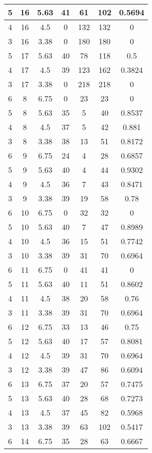\documentclass[letterpaper, 12pt]{article}
\begin{document}
\begin{longtable}{|c|c|c|c|c|c|c|}
\hline
5 & 16 & 5.63 & 41 & 61 & 102 & 0.5694 \\
\hline
4 & 16 & 4.5 & 0 & 132 & 132 & 0 \\
\hline
3 & 16 & 3.38 & 0 & 180 & 180 & 0 \\
\hline
5 & 17 & 5.63 & 40 & 78 & 118 & 0.5 \\
\hline
4 & 17 & 4.5 & 39 & 123 & 162 & 0.3824 \\
\hline
3 & 17 & 3.38 & 0 & 218 & 218 & 0 \\
\hline
6 & 8 & 6.75 & 0 & 23 & 23 & 0 \\
\hline
5 & 8 & 5.63 & 35 & 5 & 40 & 0.8537 \\
\hline
4 & 8 & 4.5 & 37 & 5 & 42 & 0.881 \\
\hline
3 & 8 & 3.38 & 38 & 13 & 51 & 0.8172 \\
\hline
6 & 9 & 6.75 & 24 & 4 & 28 & 0.6857 \\
\hline
5 & 9 & 5.63 & 40 & 4 & 44 & 0.9302 \\
\hline
4 & 9 & 4.5 & 36 & 7 & 43 & 0.8471 \\
\hline
3 & 9 & 3.38 & 39 & 19 & 58 & 0.78 \\
\hline
6 & 10 & 6.75 & 0 & 32 & 32 & 0 \\
\hline
5 & 10 & 5.63 & 40 & 7 & 47 & 0.8989 \\
\hline
4 & 10 & 4.5 & 36 & 15 & 51 & 0.7742 \\
\hline
3 & 10 & 3.38 & 39 & 31 & 70 & 0.6964 \\
\hline
6 & 11 & 6.75 & 0 & 41 & 41 & 0 \\
\hline
5 & 11 & 5.63 & 40 & 11 & 51 & 0.8602 \\
\hline
4 & 11 & 4.5 & 38 & 20 & 58 & 0.76 \\
\hline
3 & 11 & 3.38 & 39 & 31 & 70 & 0.6964 \\
\hline
6 & 12 & 6.75 & 33 & 13 & 46 & 0.75 \\
\hline
5 & 12 & 5.63 & 40 & 17 & 57 & 0.8081 \\
\hline
4 & 12 & 4.5 & 39 & 31 & 70 & 0.6964 \\
\hline
3 & 12 & 3.38 & 39 & 47 & 86 & 0.6094 \\
\hline
6 & 13 & 6.75 & 37 & 20 & 57 & 0.7475 \\
\hline
5 & 13 & 5.63 & 40 & 28 & 68 & 0.7273 \\
\hline
4 & 13 & 4.5 & 37 & 45 & 82 & 0.5968 \\
\hline
3 & 13 & 3.38 & 39 & 63 & 102 & 0.5417 \\
\hline
6 & 14 & 6.75 & 35 & 28 & 63 & 0.6667 \\

\end{longtable}
\end{document}
